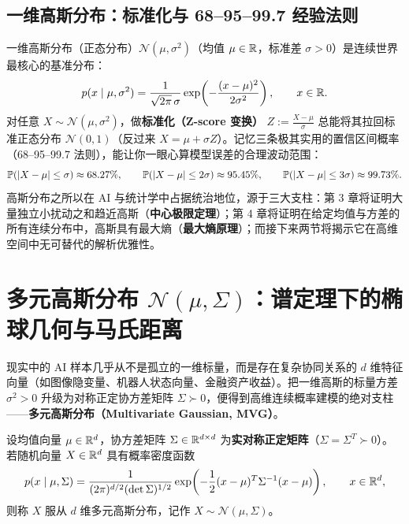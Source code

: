 \subsection{一维高斯分布：标准化与 68--95--99.7 经验法则}

一维高斯分布（正态分布）$\mathcal{N}(\mu, \sigma^2)$（均值 $\mu \in \mathbb{R}$，标准差 $\sigma > 0$）是连续世界最核心的基准分布：
\[
  p(x \mid \mu, \sigma^2) = \frac{1}{\sqrt{2\pi}\,\sigma} \exp\!\left(-\frac{(x - \mu)^2}{2\sigma^2}\right), \qquad x \in \mathbb{R}.
\]
对任意 $X \sim \mathcal{N}(\mu, \sigma^2)$，做\textbf{标准化（Z-score 变换）} $Z := \frac{X - \mu}{\sigma}$ 总能将其拉回标准正态分布 $\mathcal{N}(0, 1)$（反过来 $X = \mu + \sigma Z$）。记忆三条极其实用的置信区间概率（68--95--99.7 法则），能让你一眼心算模型误差的合理波动范围：
\[
  \mathbb{P}(|X-\mu|\le \sigma) \approx 68.27\%, \qquad
  \mathbb{P}(|X-\mu|\le 2\sigma) \approx 95.45\%, \qquad
  \mathbb{P}(|X-\mu|\le 3\sigma) \approx 99.73\%.
\]
高斯分布之所以在 AI 与统计学中占据统治地位，源于三大支柱：第 3 章将证明大量独立小扰动之和趋近高斯（\textbf{中心极限定理}）；第 4 章将证明在给定均值与方差的所有连续分布中，高斯具有最大熵（\textbf{最大熵原理}）；而接下来两节将揭示它在高维空间中无可替代的解析优雅性。

\section{多元高斯分布 $\mathcal{N}(\mu, \Sigma)$：谱定理下的椭球几何与马氏距离}
\label{sec:ch2-mvg-geom}

现实中的 AI 样本几乎从不是孤立的一维标量，而是存在复杂协同关系的 $d$ 维特征向量（如图像隐变量、机器人状态向量、金融资产收益）。把一维高斯的标量方差 $\sigma^2 > 0$ 升级为对称正定协方差矩阵 $\Sigma \succ 0$，便得到高维连续概率建模的绝对支柱——\textbf{多元高斯分布（Multivariate Gaussian, MVG）}。

\begin{defBox}
\begin{definition}
\label{def:ch2-mvg}
设均值向量 $\mu \in \mathbb{R}^d$，协方差矩阵 $\Sigma \in \mathbb{R}^{d\times d}$ 为\textbf{实对称正定矩阵}（$\Sigma = \Sigma^T \succ 0$）。若随机向量 $X \in \mathbb{R}^d$ 具有概率密度函数
\begin{equation}
  p(x \mid \mu, \Sigma)
  = \frac{1}{(2\pi)^{d/2}(\det\Sigma)^{1/2}}
    \exp\!\left(-\frac{1}{2}(x - \mu)^T \Sigma^{-1} (x - \mu)\right), \qquad x \in \mathbb{R}^d,
  \label{eq:ch2-mvg-pdf}
\end{equation}
则称 $X$ 服从 $d$ 维多元高斯分布，记作 $X \sim \mathcal{N}(\mu, \Sigma)$。
\end{definition}
\end{defBox}

